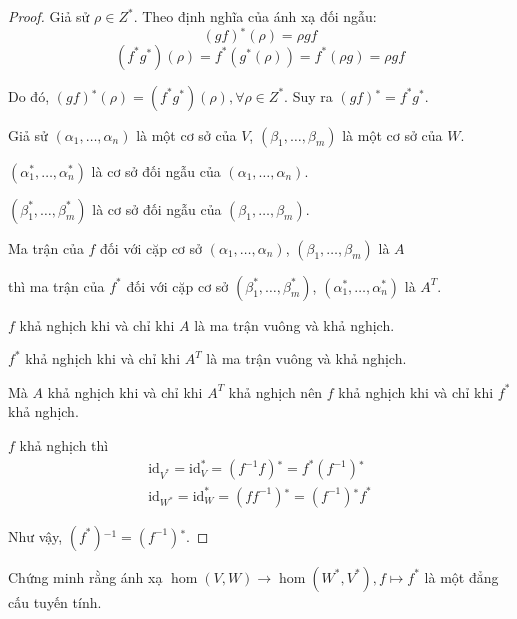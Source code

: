 \documentclass[class=linearalgebra,crop=false]{standalone}
\begin{document}
\begin{proof}
    Giả sử $\rho\in Z^{*}$. Theo định nghĩa của ánh xạ đối ngẫu:
    \[
        (gf){}^{*}(\rho) = \rho gf
    \]
    \[
        (f^{*}g^{*})(\rho) = f^{*}(g^{*}(\rho)) = f^{*}(\rho g) = \rho gf
    \]
    \par Do đó, $(gf){}^{*}(\rho) = (f^{*}g^{*})(\rho), \forall\rho\in Z^{*}$. Suy ra $(gf){}^{*} = f^{*}g^{*}$.
    \bigskip
    \par Giả sử $(\alpha_{1}, \ldots, \alpha_{n})$ là một cơ sở của $V$, $(\beta_{1}, \ldots, \beta_{m})$ là một cơ sở của $W$.
    \par $(\alpha^{*}_{1}, \ldots, \alpha^{*}_{n})$ là cơ sở đối ngẫu của $(\alpha_{1}, \ldots, \alpha_{n})$.
    \par $(\beta^{*}_{1}, \ldots, \beta^{*}_{m})$ là cơ sở đối ngẫu của $(\beta_{1}, \ldots, \beta_{m})$.
    \par Ma trận của $f$ đối với cặp cơ sở $(\alpha_{1}, \ldots, \alpha_{n})$, $(\beta_{1}, \ldots, \beta_{m})$ là $A$
    \par thì ma trận của $f^{*}$ đối với cặp cơ sở $(\beta^{*}_{1}, \ldots, \beta^{*}_{m})$, $(\alpha^{*}_{1}, \ldots, \alpha^{*}_{n})$ là $A^{T}$.
    \par $f$ khả nghịch khi và chỉ khi $A$ là ma trận vuông và khả nghịch.
    \par $f^{*}$ khả nghịch khi và chỉ khi $A^{T}$ là ma trận vuông và khả nghịch.
    \par Mà $A$ khả nghịch khi và chỉ khi $A^{T}$ khả nghịch nên $f$ khả nghịch khi và chỉ khi $f^{*}$ khả nghịch.
    \bigskip
    \par $f$ khả nghịch thì
    \[
        \begin{split}
            \text{id}_{V^{*}} = \text{id}^{*}_{V} = (f^{-1}f){}^{*} = f^{*}(f^{-1}){}^{*} \\
            \text{id}_{W^{*}} = \text{id}^{*}_{W} = (ff^{-1}){}^{*} = (f^{-1}){}^{*}f^{*}
        \end{split}
    \]
    \par Như vậy, $(f^{*}){}^{-1} = (f^{-1}){}^{*}$.
\end{proof}

\begin{exercise}
    Chứng minh rằng ánh xạ $\hom(V, W)\to\hom(W^{*}, V^{*}), f\mapsto f^{*}$ là một đẳng cấu tuyến tính.
\end{exercise}
\end{document}
